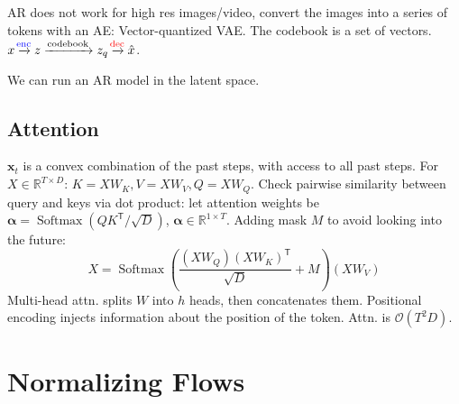 \documentclass[11pt,landscape,a4paper,fleqn]{article}
\newcommand*{\tran}{^{\mathsf{T}}} %
\DeclareMathOperator{\softmax}{\mathrm{Softmax}}
\newcommand{\R}{\mathbb{R}}
\def\myvector#1{\mathbf{#1}}
\def\vx{{\myvector{x}}}
\begin{document}
\begin{multicols*}{4}
AR does not work for high res images/video, convert the images into a series of tokens with an AE:
Vector-quantized VAE.
The codebook is a set of vectors.
$x \xrightarrow{\mathrm{\makebox[0pt]{\scriptsize \textcolor{blue}{enc}}}} z \xrightarrow{\mathrm{codebook}} z_q \xrightarrow{\mathrm{\makebox[0pt]{\scriptsize \textcolor{red}{dec}}}} \hat{x}$.

We can run an AR model in the latent space.

\subsection{Attention}

$\vx_t$ is a convex combination of the past steps, with access to all past steps.
For $X \in \R^{T \times D}$: 
$K = XW_K, V = XW_V, Q = XW_Q$.
Check pairwise similarity between query and keys via dot product:
let attention weights be $\bm{\alpha} = \softmax(QK\tran / \sqrt{D})$, $\bm{\alpha} \in \R^{1 \times T}$.
Adding mask $M$ to avoid looking into the future:
\[X = \softmax\left(\frac{(XW_Q)(XW_K)\tran}{\sqrt{D}} + M\right)(XW_V)\]
Multi-head attn. splits $W$ into $h$ heads, then concatenates them.
Positional encoding injects information about the position of the token.
Attn. is $\mathcal{O}(T^2 D)$.

\section{Normalizing Flows}


\end{multicols*}
\end{document}

